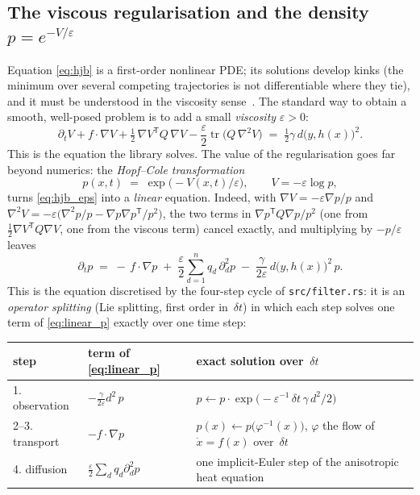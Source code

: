 \documentclass[11pt,a4paper]{article}
\newcommand{\tr}{\operatorname{tr}}
\newcommand{\T}{^{\mathsf T}}
\newcommand{\eps}{\varepsilon}
\newcommand{\grad}{\nabla}
\newcommand{\dt}{\,\delta t}
\theoremstyle{plain}
\theoremstyle{definition}
\theoremstyle{remark}
\begin{document}
\subsection{The viscous regularisation and the density \texorpdfstring{$p=e^{-V/\eps}$}{p = exp(-V/eps)}}

Equation \eqref{eq:hjb} is a first-order nonlinear PDE; its solutions develop kinks (the minimum over several competing trajectories is not differentiable where they tie), and it must be understood in the viscosity sense~\cite{BardiCD1997}. The standard way to obtain a smooth, well-posed problem is to add a small \emph{viscosity} $\eps>0$:
\begin{equation}
  \partial_t V + f\cdot\grad V + \tfrac12\,\grad V\T Q\,\grad V - \frac{\eps}{2}\tr\big(Q\,\grad^2 V\big) \;=\; \tfrac12\gamma\, d\big(y,h(x)\big)^2 .
  \label{eq:hjb_eps}
\end{equation}
This is the equation the library solves. The value of the regularisation goes far beyond numerics: the \emph{Hopf--Cole transformation}
\begin{equation}
  p(x,t) \;=\; \exp\!\big(-V(x,t)/\eps\big), \qquad V = -\eps\log p,
  \label{eq:hopfcole}
\end{equation}
turns \eqref{eq:hjb_eps} into a \emph{linear} equation. Indeed, with $\grad V=-\eps\grad p/p$ and $\grad^2 V = -\eps\big(\grad^2 p/p - \grad p\grad p\T/p^2\big)$, the two terms in $\grad p\T Q\grad p/p^2$ (one from $\tfrac12\grad V\T Q\grad V$, one from the viscous term) cancel exactly, and multiplying by $-p/\eps$ leaves
\begin{equation}
  \boxed{\;
  \partial_t p \;=\; -\,f\cdot\grad p \;+\; \frac{\eps}{2}\sum_{d=1}^n q_d\,\partial_d^2 p \;-\; \frac{\gamma}{2\eps}\, d\big(y,h(x)\big)^2\, p .\;}
  \label{eq:linear_p}
\end{equation}
This is the equation discretised by the four-step cycle of \texttt{src/filter.rs}: it is an \emph{operator splitting} (Lie splitting, first order in $\dt$) in which each step solves one term of \eqref{eq:linear_p} exactly over one time step:
\begin{center}
\begin{tabular}{@{}lll@{}}
\toprule
step & term of \eqref{eq:linear_p} & exact solution over $\dt$ \\
\midrule
1. observation & $-\frac{\gamma}{2\eps} d^2\, p$ & $p \leftarrow p\cdot\exp\!\big(-\eps^{-1}\dt\,\gamma\, d^2/2\big)$ \\
2--3. transport & $-f\cdot\grad p$ & $p(x) \leftarrow p\big(\varphi^{-1}(x)\big)$, $\varphi$ the flow of $\dot x=f(x)$ over $\dt$ \\
4. diffusion & $\frac{\eps}{2}\sum_d q_d\partial_d^2 p$ & one implicit-Euler step of the anisotropic heat equation \\
\bottomrule
\end{tabular}
\end{center}
\end{document}
